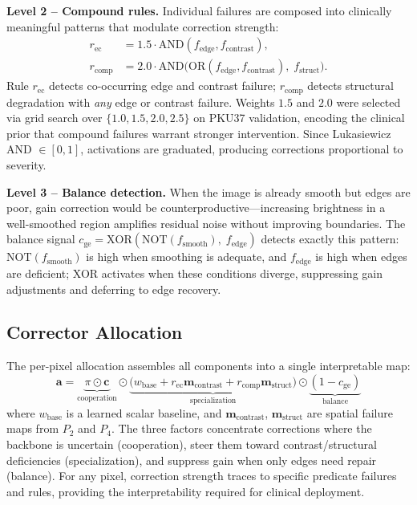 \documentclass[journal,twoside,web]{ieeecolor}
\begin{document}
\textbf{Level 2 -- Compound rules.} Individual failures are composed into clinically meaningful patterns that modulate correction strength:
\begin{align}
r_\text{ec} &= 1.5 \cdot \text{AND}(f_\text{edge}, f_\text{contrast}), \label{eq:compound1} \\
r_\text{comp} &= 2.0 \cdot \text{AND}\!\big(\text{OR}(f_\text{edge}, f_\text{contrast}),\; f_\text{struct}\big). \label{eq:compound2}
\end{align}
Rule $r_\text{ec}$ detects co-occurring edge and contrast failure; $r_\text{comp}$ detects structural degradation with \emph{any} edge or contrast failure. Weights $1.5$ and $2.0$ were selected via grid search over $\{1.0, 1.5, 2.0, 2.5\}$ on PKU37 validation, encoding the clinical prior that compound failures warrant stronger intervention. Since Lukasiewicz AND $\in [0, 1]$, activations are graduated, producing corrections proportional to severity.

\textbf{Level 3 -- Balance detection.} When the image is already smooth but edges are poor, gain correction would be counterproductive---increasing brightness in a well-smoothed region amplifies residual noise without improving boundaries. The balance signal $c_\text{ge} = \text{XOR}(\text{NOT}(f_\text{smooth}),\; f_\text{edge})$ detects exactly this pattern: $\text{NOT}(f_\text{smooth})$ is high when smoothing is adequate, and $f_\text{edge}$ is high when edges are deficient; XOR activates when these conditions diverge, suppressing gain adjustments and deferring to edge recovery.

\subsection{Corrector Allocation}
The per-pixel allocation assembles all components into a single interpretable map:
\begin{equation}
\mathbf{a} = \underbrace{\pi \odot \mathbf{c}}_{\text{cooperation}} \odot \underbrace{\big(w_{\text{base}} + r_{\text{ec}}\mathbf{m}_{\text{contrast}} + r_{\text{comp}}\mathbf{m}_{\text{struct}}\big)}_{\text{specialization}} \odot \underbrace{(1 - c_{\text{ge}})}_{\text{balance}}
\label{eq:allocation}
\end{equation}
where $w_\text{base}$ is a learned scalar baseline, and $\mathbf{m}_\text{contrast}$, $\mathbf{m}_\text{struct}$ are spatial failure maps from $P_2$ and $P_4$. The three factors concentrate corrections where the backbone is uncertain (cooperation), steer them toward contrast/structural deficiencies (specialization), and suppress gain when only edges need repair (balance). For any pixel, correction strength traces to specific predicate failures and rules, providing the interpretability required for clinical deployment.
\end{document}
